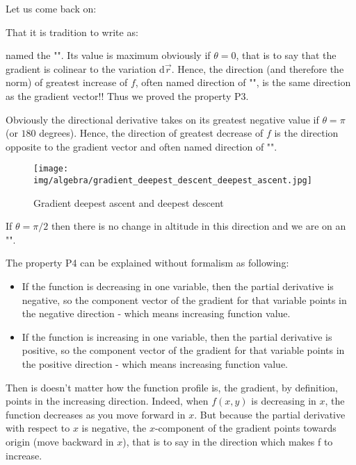 	Let us come back on:
	
	That it is tradition to write as:
	
	named the "". Its value is maximum obviously if $\theta=0$, that is to say that the gradient is colinear to the variation $\mathrm{d}\vec{r}$. Hence, the direction (and therefore the norm) of greatest increase of $f$, often named direction of "\label{eepest ascent}", is the same direction as the gradient vector!! Thus we proved the property P3.
	
	Obviously the directional derivative takes on its greatest negative value if $\theta=\pi$ (or $180$ degrees). Hence, the direction of greatest decrease of $f$ is the direction opposite to the gradient vector and often named direction of "\label{eepest descent}".
	\begin{figure}[H]
		\centering
		\texttt{[image: img/algebra/gradient\_deepest\_descent\_deepest\_ascent.jpg]}
		\caption{Gradient deepest ascent and deepest descent}
	\end{figure}
	If $\theta=\pi/2$ then there is no change in altitude in this direction and we are on an "".
	
	The property P4 can be explained without formalism as following:
	\begin{itemize}
		\item If the function is decreasing in one variable, then the partial derivative is negative, so the component vector of the gradient for that variable points in the negative direction - which means increasing function value.

		\item If the function is increasing in one variable, then the partial derivative is positive, so the component vector of the gradient for that variable points in the positive direction - which means increasing function value.
	\end{itemize}
	Then is doesn't matter how the function profile is, the gradient, by definition, points in the increasing direction. Indeed, when 	
$f(x,y)$ is decreasing in $x$, the function decreases as you move forward in $x$. But because the partial derivative with respect to $x$ is negative, the $x$-component of the gradient points towards origin (move backward in $x$), that is to say in the direction which makes f to increase.
	

